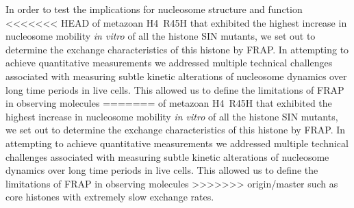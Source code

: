     In order to test the implications for nucleosome structure and function
<<<<<<< HEAD
    of metazoan H4~R45H that exhibited the highest increase 
    in nucleosome mobility \textit{in vitro} of all the histone SIN mutants,
    we set out to determine the exchange characteristics of this histone by FRAP.
    In attempting to achieve quantitative measurements 
    we addressed multiple technical challenges associated with 
    measuring subtle kinetic alterations of nucleosome dynamics over long time periods in live cells. 
    This allowed us to define the limitations of FRAP in observing molecules 
=======
    of metazoan H4~R45H that exhibited the highest increase
    in nucleosome mobility \textit{in vitro} of all the histone SIN mutants,
    we set out to determine the exchange characteristics
    of this histone by FRAP.
    In attempting to achieve quantitative measurements
    we addressed multiple technical challenges associated with
    measuring subtle kinetic alterations of nucleosome dynamics
    over long time periods in live cells.
    This allowed us to define the limitations of FRAP in observing molecules
>>>>>>> origin/master
    such as core histones with extremely slow exchange rates.
